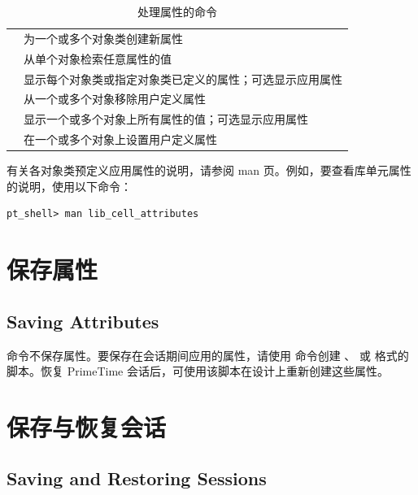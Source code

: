 \begin{table}[htbp]
\centering
\caption{处理属性的命令}\label{tab:attribute-cmds}
\begin{tabular}{|L{0.28\textwidth}|L{0.62\textwidth}|}
\hline
{} &  \\
\hline
{} & 为一个或多个对象类创建新属性 \\
 & 从单个对象检索任意属性的值 \\
 & 显示每个对象类或指定对象类已定义的属性；可选显示应用属性 \\
 & 从一个或多个对象移除用户定义属性 \\
 & 显示一个或多个对象上所有属性的值；可选显示应用属性 \\
 & 在一个或多个对象上设置用户定义属性 \\
\hline
\end{tabular}
\end{table}

有关各对象类预定义应用属性的说明，请参阅 man 页。例如，要查看库单元属性的说明，使用以下命令：
\begin{lstlisting}
pt_shell> man lib_cell_attributes
\end{lstlisting}

\section{保存属性}
\subsection*{Saving Attributes}

 命令不保存属性。要保存在会话期间应用的属性，请使用  命令创建 、 或  格式的脚本。恢复 PrimeTime 会话后，可使用该脚本在设计上重新创建这些属性。

\section{保存与恢复会话}
\subsection*{Saving and Restoring Sessions}

